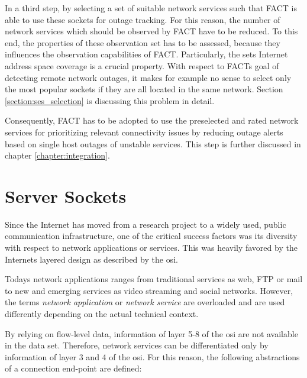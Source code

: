 In a third step, by selecting a set of suitable network services such that \gls{FACT} is able to use these sockets for outage tracking. For this reason, the number of network services which should be observed by \gls{FACT} have to be reduced. To this end, the properties of these observation set has to be assessed, because they influences the observation capabilities of \gls{FACT}. Particularly, the sets Internet address space coverage is a crucial property. With respect to FACTs goal of detecting remote network outages, it makes for example no sense to select only the most popular sockets if they are all located in the same network. Section \ref{section:ses_selection} is discussing this problem in detail. 

Consequently, \gls{FACT} has to be adopted to use the preselected and rated network services for prioritizing relevant connectivity issues by reducing outage alerts based on single host outages of unstable services. This step is further discussed in chapter \ref{chapter:integration}.

\section{Server Sockets}
Since the Internet has moved from a research project to a widely used, public communication infrastructure, one of the critical success factors was its diversity with respect to network applications or services. This was heavily favored by the Internets layered design as described by the \gls{osi}.

Todays network applications ranges from traditional services as web, \gls{FTP} or mail to new and emerging services as video streaming and social networks. However, the terms \emph{network application} or \emph{network service} are overloaded and are used differently depending on the actual technical context.

By relying on flow-level data, information of layer 5-8 of the \gls{osi} are not available in the data set. Therefore, network services can be differentiated only by information of layer 3 and 4 of the \gls{osi}. For this reason, the following abstractions of a connection end-point are defined:

